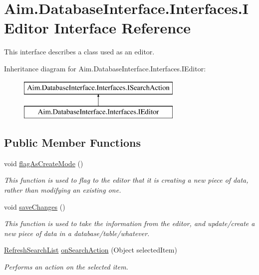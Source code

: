 \hypertarget{interface_aim_1_1_database_interface_1_1_interfaces_1_1_i_editor}{}\section{Aim.\+Database\+Interface.\+Interfaces.\+I\+Editor Interface Reference}
\label{interface_aim_1_1_database_interface_1_1_interfaces_1_1_i_editor}


This interface describes a class used as an editor.  


Inheritance diagram for Aim.\+Database\+Interface.\+Interfaces.\+I\+Editor\+:\begin{figure}[H]
\begin{center}
\leavevmode
\includegraphics[height=2.000000cm]{interface_aim_1_1_database_interface_1_1_interfaces_1_1_i_editor}
\end{center}
\end{figure}
\subsection*{Public Member Functions}
\begin{DoxyCompactItemize}
\item 
void \mbox{\hyperlink{interface_aim_1_1_database_interface_1_1_interfaces_1_1_i_editor_af807eaca31352ebcef7a868941a1b20f}{flag\+As\+Create\+Mode}} ()
\begin{DoxyCompactList}\small\item\em This function is used to flag to the editor that it is creating a new piece of data, rather than modifying an existing one. \end{DoxyCompactList}\item 
void \mbox{\hyperlink{interface_aim_1_1_database_interface_1_1_interfaces_1_1_i_editor_a14261f4aef51599f166b1f2ed1e79478}{save\+Changes}} ()
\begin{DoxyCompactList}\small\item\em This function is used to take the information from the editor, and update/create a new piece of data in a database/table/whatever. \end{DoxyCompactList}\item 
\mbox{\hyperlink{namespace_aim_1_1_database_interface_1_1_interfaces_aafb04e83cb5c64ff04eaca9a548186eb}{Refresh\+Search\+List}} \mbox{\hyperlink{interface_aim_1_1_database_interface_1_1_interfaces_1_1_i_search_action_ab23ff488687e962a6806ee8d0f91560c}{on\+Search\+Action}} (Object selected\+Item)
\begin{DoxyCompactList}\small\item\em Performs an action on the selected item. \end{DoxyCompactList}\end{DoxyCompactItemize}
